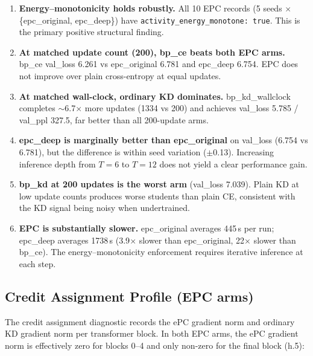\documentclass[11pt,a4paper]{article}
\begin{document}
\begin{enumerate}
  \item \textbf{Energy--monotonicity holds robustly.}
    All 10 EPC records (5 seeds $\times$ \{epc\_original,
    epc\_deep\}) have \texttt{activity\_energy\_monotone: true}.
    This is the primary positive structural finding.

  \item \textbf{At matched update count (200), bp\_ce beats both EPC
    arms.}
    bp\_ce val\_loss 6.261 vs epc\_original 6.781 and epc\_deep 6.754.
    EPC does not improve over plain cross-entropy at equal updates.

  \item \textbf{At matched wall-clock, ordinary KD dominates.}
    bp\_kd\_wallclock completes $\sim$6.7$\times$ more updates (1334
    vs 200) and achieves val\_loss 5.785 / val\_ppl 327.5, far better
    than all 200-update arms.

  \item \textbf{epc\_deep is marginally better than epc\_original}
    on val\_loss (6.754 vs 6.781), but the difference is within seed
    variation ($\pm$0.13).  Increasing inference depth from $T{=}6$ to
    $T{=}12$ does not yield a clear performance gain.

  \item \textbf{bp\_kd at 200 updates is the worst arm}
    (val\_loss 7.039).  Plain KD at low update counts produces worse
    students than plain CE, consistent with the KD signal being noisy
    when undertrained.

  \item \textbf{EPC is substantially slower.}
    epc\_original averages 445\,s per run; epc\_deep averages 1738\,s
    (3.9$\times$ slower than epc\_original, 22$\times$ slower than
    bp\_ce).  The energy--monotonicity enforcement requires iterative
    inference at each step.
\end{enumerate}

\subsection{Credit Assignment Profile (EPC arms)}

The credit assignment diagnostic records the ePC gradient norm and
ordinary KD gradient norm per transformer block.  In both EPC arms,
the ePC gradient norm is effectively zero for blocks 0--4 and only
non-zero for the final block (h.5):
\end{document}
